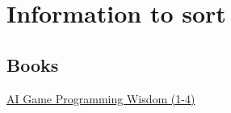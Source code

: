 
\chapter{Information to sort}
\label{ch:Info}

\section{Books}
\href{http://aiwisdom.com/ai_genrerts.html}{AI Game Programming Wisdom (1-4)}

